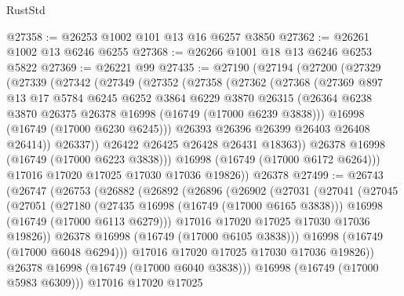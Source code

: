 \begin{lexlean}{RustStd}
\begin{coremodule}
@27358 := @26253 @1002 @101 @13 @16 @6257 @3850
@27362 := @26261 @1002 @13 @6246 @6255
@27368 := @26266 @1001 @18 @13 @6246 @6253 @5822
@27369 := @26221 @99
@27435 := @27190
    (@27194
      (@27200
        (@27329
          (@27339
            (@27342
              (@27349
                (@27352
                  (@27358
                    (@27362
                      (@27368
                        (@27369
                          @897
                          @13
                          @17
                          @5784
                          @6245
                          @6252
                          @3864
                          @6229
                          @3870
                          @26315
                          (@26364 @6238 @3870 @26375 @26378 @16998 (@16749 (@17000 @6239 @3838)))
                          @16998
                          (@16749 (@17000 @6230 @6245)))
                        @26393
                        @26396
                        @26399
                        @26403
                        @26408
                        @26414))
                    @26337))
                @26422
                @26425
                @26428
                @26431
                @18363))
            @26378
            @16998
            (@16749 (@17000 @6223 @3838)))
          @16998
          (@16749 (@17000 @6172 @6264)))
        @17016
        @17020
        @17025
        @17030
        @17036
        @19826))
    @26378
@27499 := @26743
    (@26747
      (@26753
        (@26882
          (@26892
            (@26896
              (@26902
                (@27031
                  (@27041
                    (@27045
                      (@27051
                        (@27180
                          (@27435 @16998 (@16749 (@17000 @6165 @3838)))
                          @16998
                          (@16749 (@17000 @6113 @6279)))
                        @17016
                        @17020
                        @17025
                        @17030
                        @17036
                        @19826))
                    @26378
                    @16998
                    (@16749 (@17000 @6105 @3838)))
                  @16998
                  (@16749 (@17000 @6048 @6294)))
                @17016
                @17020
                @17025
                @17030
                @17036
                @19826))
            @26378
            @16998
            (@16749 (@17000 @6040 @3838)))
          @16998
          (@16749 (@17000 @5983 @6309)))
        @17016
        @17020
        @17025

\end{coremodule}
\end{lexlean}
